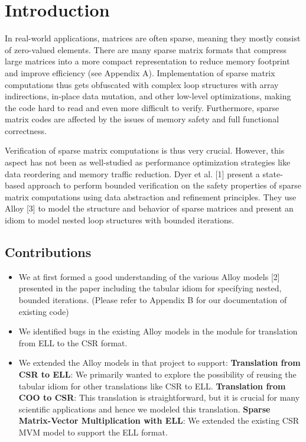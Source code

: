 \documentclass[conference]{IEEEtran}
\begin{document}
\section{Introduction}
In real-world applications, matrices are often sparse, meaning they mostly consist of zero-valued elements. There are many sparse matrix formats that compress large matrices into a more compact representation to reduce memory footprint and improve efficiency (see Appendix A). Implementation of sparse matrix computations thus gets obfuscated with complex loop structures with array indirections, in-place data mutation, and other low-level optimizations, making the code hard to read and even more difficult to verify. Furthermore, sparse matrix codes are affected by the issues of memory safety and full functional correctness.

Verification of sparse matrix computations is thus very crucial. However, this aspect has not been as well-studied as performance optimization strategies like data reordering and memory traffic reduction. Dyer et al. [1] present a state-based approach to perform bounded verification on the safety properties of sparse matrix computations using data abstraction and refinement principles. They use Alloy [3] to model the structure and behavior of sparse matrices and present an idiom to model nested loop structures with bounded iterations.

\subsection{Contributions}
\begin{itemize}
    \item We at first formed a good understanding of the various Alloy models [2] presented in the paper including the tabular idiom for specifying nested, bounded iterations. (Please refer to Appendix B for our documentation of existing code)
    \item We identified bugs in the existing Alloy models in the module for translation from ELL to the CSR format.
    \item We extended the Alloy models in that project to support:
\textbf{Translation from CSR to ELL}: We primarily wanted to explore the possibility of reusing the tabular idiom for other translations like CSR to ELL.
\textbf{Translation from COO to CSR}: This translation is straightforward, but it is crucial for many scientific applications and hence we modeled this translation.
\textbf{Sparse Matrix-Vector Multiplication with ELL}: We extended the existing CSR MVM model to support the ELL format.

\end{itemize}
\end{document}
